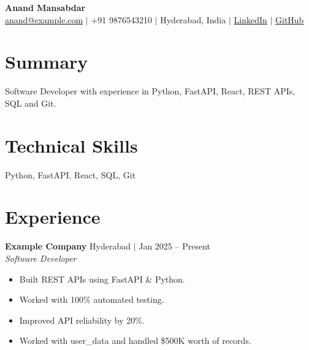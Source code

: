 \documentclass[10pt,letterpaper]{article}
\begin{document}

\begin{center}
    {\LARGE \textbf{Anand Mansabdar}}\\[4pt]

    \href{mailto:anand@example.com}{anand@example.com} $|$ +91 9876543210 $|$ Hyderabad, India $|$ \href{https://linkedin.com/in/example}{LinkedIn} $|$ \href{https://github.com/example}{GitHub}
\end{center}


\section{Summary}
Software Developer with experience in Python, FastAPI, React, REST APIs, SQL and Git.



\section{Technical Skills}
Python, FastAPI, React, SQL, Git



\section{Experience}
\textbf{Example Company} \hfill Hyderabad $|$ Jan 2025 -- Present \\
\textit{Software Developer}
\begin{itemize}
\item Built REST APIs using FastAPI \& Python.
\item Worked with 100\% automated testing.
\item Improved API reliability by 20\%.
\item Worked with user\_data and handled \$500K worth of records.
\end{itemize}


\end{document}
